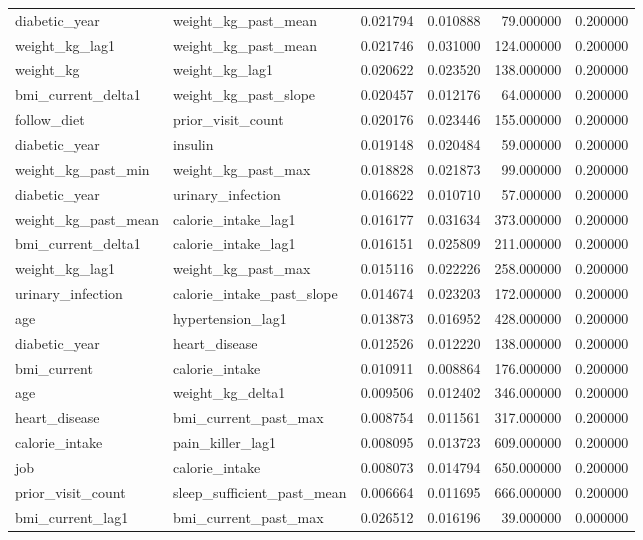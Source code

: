 \begin{longtable}{llrrrr}
diabetic\_year & weight\_kg\_past\_mean & 0.021794 & 0.010888 & 79.000000 & 0.200000 \\
weight\_kg\_lag1 & weight\_kg\_past\_mean & 0.021746 & 0.031000 & 124.000000 & 0.200000 \\
weight\_kg & weight\_kg\_lag1 & 0.020622 & 0.023520 & 138.000000 & 0.200000 \\
bmi\_current\_delta1 & weight\_kg\_past\_slope & 0.020457 & 0.012176 & 64.000000 & 0.200000 \\
follow\_diet & prior\_visit\_count & 0.020176 & 0.023446 & 155.000000 & 0.200000 \\
diabetic\_year & insulin & 0.019148 & 0.020484 & 59.000000 & 0.200000 \\
weight\_kg\_past\_min & weight\_kg\_past\_max & 0.018828 & 0.021873 & 99.000000 & 0.200000 \\
diabetic\_year & urinary\_infection & 0.016622 & 0.010710 & 57.000000 & 0.200000 \\
weight\_kg\_past\_mean & calorie\_intake\_lag1 & 0.016177 & 0.031634 & 373.000000 & 0.200000 \\
bmi\_current\_delta1 & calorie\_intake\_lag1 & 0.016151 & 0.025809 & 211.000000 & 0.200000 \\
weight\_kg\_lag1 & weight\_kg\_past\_max & 0.015116 & 0.022226 & 258.000000 & 0.200000 \\
urinary\_infection & calorie\_intake\_past\_slope & 0.014674 & 0.023203 & 172.000000 & 0.200000 \\
age & hypertension\_lag1 & 0.013873 & 0.016952 & 428.000000 & 0.200000 \\
diabetic\_year & heart\_disease & 0.012526 & 0.012220 & 138.000000 & 0.200000 \\
bmi\_current & calorie\_intake & 0.010911 & 0.008864 & 176.000000 & 0.200000 \\
age & weight\_kg\_delta1 & 0.009506 & 0.012402 & 346.000000 & 0.200000 \\
heart\_disease & bmi\_current\_past\_max & 0.008754 & 0.011561 & 317.000000 & 0.200000 \\
calorie\_intake & pain\_killer\_lag1 & 0.008095 & 0.013723 & 609.000000 & 0.200000 \\
job & calorie\_intake & 0.008073 & 0.014794 & 650.000000 & 0.200000 \\
prior\_visit\_count & sleep\_sufficient\_past\_mean & 0.006664 & 0.011695 & 666.000000 & 0.200000 \\
bmi\_current\_lag1 & bmi\_current\_past\_max & 0.026512 & 0.016196 & 39.000000 & 0.000000 \\

\end{longtable}
